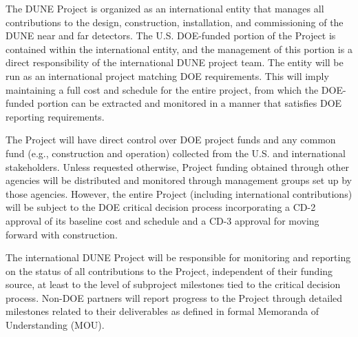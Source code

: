 The DUNE Project is organized as an international entity that manages
all contributions to the design, construction, installation, and
commissioning of the DUNE near and far detectors.  The U.S. DOE-funded
portion of the Project is contained within the international entity,
and the management of this portion is a direct responsibility of the
international DUNE project team.  The entity will be run as an
international project matching DOE requirements. This will imply
maintaining a full cost and schedule for the entire project, from
which the DOE-funded portion can be extracted and monitored in a
manner that satisfies DOE reporting requirements.

The Project will have direct control over DOE project funds and any
common fund (e.g., construction and operation) collected from the
U.S. and international stakeholders. Unless requested otherwise,
Project funding obtained through other agencies will be distributed
and monitored through management groups set up by those agencies.
However, the entire Project (including international contributions)
will be subject to the DOE critical decision process incorporating a
CD-2 approval of its baseline cost and schedule and a CD-3 approval
for moving forward with construction.

The international DUNE Project will be responsible for monitoring and
reporting on the status of all contributions to the Project,
independent of their funding source, at least to the level of
subproject milestones tied to the critical decision process.  Non-DOE
partners will report progress to the Project through detailed
milestones related to their deliverables as defined in formal
Memoranda of Understanding (MOU).
